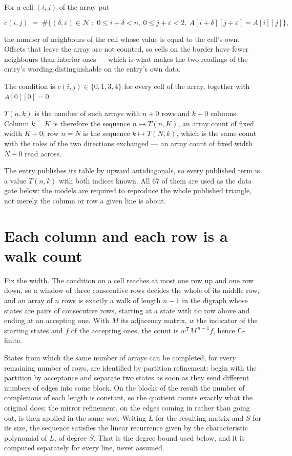 \documentclass[11pt]{article}
\theoremstyle{definition}
\begin{document}
For a cell $(i,j)$ of the array put

\[c(i,j) \;=\; \#\bigl\{(\delta,\varepsilon)\in\mathcal{N} \;:\; 0\le i+\delta<n,\ 0\le j+\varepsilon<2,\ A[i+\delta][j+\varepsilon] = A[i][j]\bigr\},\]

the number of neighbours of the cell whose value is equal to the cell's own. Offsets that leave the array are not counted, so cells on the border have fewer neighbours than interior ones --- which is what makes the two readings of the entry's wording distinguishable on the entry's own data.

The condition is $c(i,j) \in \{0, 1, 3, 4\}$ for every cell of the array, together with $A[0][0]=0$.

$T(n,k)$ is the number of such arrays with $n + 0$ rows and $k + 0$ columns. Column $k = K$ is therefore the sequence $n \mapsto T(n,K)$, an array count of fixed width $K + 0$; row $n = N$ is the sequence $k \mapsto T(N,k)$, which is the same count with the roles of the two directions exchanged --- an array count of fixed width $N + 0$ read across.

The entry publishes its table by upward antidiagonals, so every published term is a value $T(n,k)$ with both indices known. All 67 of them are used as the data gate below: the models are required to reproduce the whole published triangle, not merely the column or row a given line is about.

\section{Each column and each row is a walk count}

Fix the width. The condition on a cell reaches at most one row up and one row down, so a window of three consecutive rows decides the whole of its middle row, and an array of $n$ rows is exactly a walk of length $n-1$ in the digraph whose states are pairs of consecutive rows, starting at a state with no row above and ending at an accepting one. With $M$ its adjacency matrix, $w$ the indicator of the starting states and $f$ of the accepting ones, the count is $w^{\mathsf T}M^{\,n-1}f$, hence C-finite.

States from which the same number of arrays can be completed, for every remaining number of rows, are identified by partition refinement: begin with the partition by acceptance and separate two states as soon as they send different numbers of edges into some block. On the blocks of the result the number of completions of each length is constant, so the quotient counts exactly what the original does; the mirror refinement, on the edges coming in rather than going out, is then applied in the same way. Writing $L$ for the resulting matrix and $S$ for its size, the sequence satisfies the linear recurrence given by the characteristic polynomial of $L$, of degree $S$. That is the degree bound used below, and it is computed separately for every line, never assumed.
\end{document}
